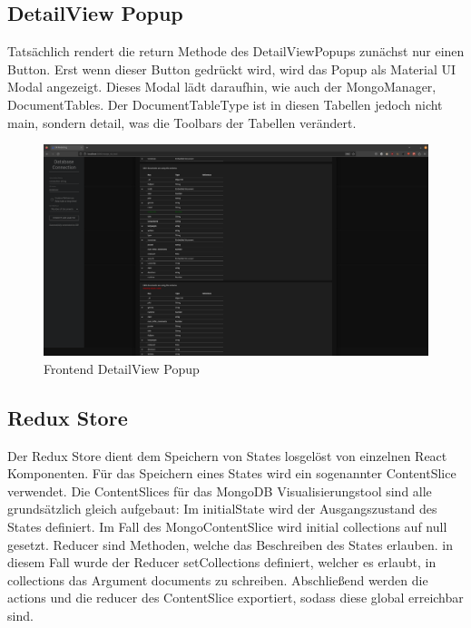 \subsection{DetailView Popup}
\label{sub:fe_detail_view}

Tatsächlich rendert die return Methode des DetailViewPopups zunächst nur einen Button. 
Erst wenn dieser Button gedrückt wird, wird das Popup als Material UI Modal angezeigt.
Dieses Modal lädt daraufhin, wie auch der MongoManager, DocumentTables.
Der DocumentTableType ist in diesen Tabellen jedoch nicht main, sondern detail, was die Toolbars der Tabellen verändert.


\begin{figure}[H]
    \includegraphics[width=\textwidth]{images/frontend_detail_view}
    \caption{Frontend DetailView Popup}
    \label{fig:frontend_detail_view}
\end{figure}

\subsection{Redux Store}
\label{sub:fe_redux}

Der Redux Store dient dem Speichern von States losgelöst von einzelnen React Komponenten.
Für das Speichern eines States wird ein sogenannter ContentSlice verwendet.
Die ContentSlices für das MongoDB Visualisierungstool sind alle grundsätzlich gleich aufgebaut:
Im initialState wird der Ausgangszustand des States definiert. 
Im Fall des MongoContentSlice wird initial collections auf null gesetzt.
Reducer sind Methoden, welche das Beschreiben des States erlauben.
in diesem Fall wurde der Reducer setCollections definiert, welcher es erlaubt, in collections das Argument documents zu schreiben.
Abschließend werden die actions und die reducer des ContentSlice exportiert, sodass diese global erreichbar sind.

